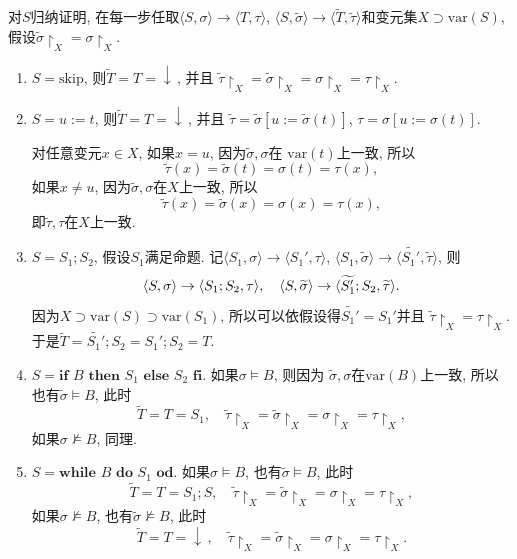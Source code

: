 \documentclass[UTF8]{ctexart}
\begin{document}
对$S$归纳证明, 在每一步任取$\langle S,\sigma\rangle\to\langle T,\tau\rangle$,
$\langle S,\widetilde{\sigma}\rangle\to
\langle\widetilde{T},\widetilde{\tau}\rangle$和变元集$X\supset\mathrm{var}(S)$,
假设$\widetilde{\sigma}\!\restriction_X=\sigma\!\restriction_X$.
\begin{enumerate}
    \item $S=\mathrm{skip}$, 则$\widetilde{T}=T=\downarrow\,$, 并且
    $\widetilde{\tau}\!\restriction_X=\widetilde{\sigma}\!\restriction_X=
    \sigma\!\restriction_X=\tau\!\restriction_X$.

    \item $S=u:=t$, 则$\widetilde{T}=T=\downarrow\,$, 并且
    $\widetilde{\tau}=\widetilde{\sigma}[u:=\widetilde{\sigma}(t)]$,
    $\tau=\sigma[u:=\sigma(t)]$.

    \hspace{2.17em}
    对任意变元$x\in X$, 如果$x=u$, 因为$\widetilde{\sigma},\sigma$在
    $\mathrm{var}(t)$上一致, 所以
    \[
        \widetilde{\tau}(x)=\widetilde{\sigma}(t)=\sigma(t)=\tau(x),
    \]
    如果$x\neq u$, 因为$\widetilde{\sigma},\sigma$在$X$上一致, 所以
    \[
        \widetilde{\tau}(x)=\widetilde{\sigma}(x)=\sigma(x)=\tau(x),
    \]
    即$\widetilde{\tau},\tau$在$X$上一致.

    \item $S=S_1;S_2$, 假设$S_1$满足命题. 记$\langle S_1,\sigma\rangle\to
    \langle S_1',\tau\rangle$, $\langle S_1,\widetilde{\sigma}\rangle\to
    \langle\widetilde{S_1'},\widetilde{\tau}\rangle$, 则
    \[
        \langle S,\sigma\rangle\to\langle S_1;S_2,\tau\rangle,\quad
        \langle S,\widetilde{\sigma}\rangle\to
        \langle\widetilde{S_1'};S_2,\widetilde{\tau}\rangle.\\[3pt]
    \]
    因为$X\supset\mathrm{var}(S)\supset\mathrm{var}(S_1)$,
    所以可以依假设得$\widetilde{S_1'}=S_1'$并且
    $\widetilde{\tau}\!\restriction_X=\tau\!\restriction_X$.
    于是$\widetilde{T}=\widetilde{S_1'};S_2=S_1';S_2=T$.

    \vspace{3pt}
    \item $S=\mathbf{if}\,\,B\,\,\mathbf{then}\,\,S_1\,\,\mathbf{else}\,\,
    S_2\,\,\mathbf{fi}$. 如果$\sigma\models B$, 则因为
    $\widetilde{\sigma},\sigma$在$\mathrm{var}(B)$上一致,
    所以也有$\widetilde{\sigma}\models B$, 此时
    \[
        \widetilde{T}=T=S_1,\quad
        \widetilde{\tau}\!\restriction_X=\widetilde{\sigma}\!\restriction_X=
        \sigma\!\restriction_X=\tau\!\restriction_X,
    \]
    如果$\sigma\not\models B$, 同理.

    \item $S=\mathbf{while}\,\,B\,\,\mathbf{do}\,\,S_1\,\,\mathbf{od}$.
    如果$\sigma\models B$, 也有$\widetilde{\sigma}\models B$, 此时
    \[
        \widetilde{T}=T=S_1;S,\quad
        \widetilde{\tau}\!\restriction_X=\widetilde{\sigma}\!\restriction_X=
        \sigma\!\restriction_X=\tau\!\restriction_X,
    \]
    如果$\sigma\not\models B$, 也有$\widetilde{\sigma}\not\models B$, 此时
    \[
        \widetilde{T}=T=\downarrow\,,\quad
        \widetilde{\tau}\!\restriction_X=\widetilde{\sigma}\!\restriction_X=
        \sigma\!\restriction_X=\tau\!\restriction_X.
    \]
\end{enumerate}
\end{document}
